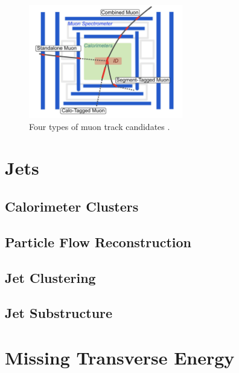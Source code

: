 \begin{figure}[h]
        \centering
	\includegraphics[width=0.6\textwidth]{figures/ch5/muon_tracks}
	\caption{Four types of muon track candidates \cite{muon_id}. }
	\label{fig:muon_tracks}
\end{figure}

\section{Jets}
\subsection{Calorimeter Clusters}
\subsection{Particle Flow Reconstruction}
\subsection{Jet Clustering}
\subsection{Jet Substructure}
\section{Missing Transverse Energy}
